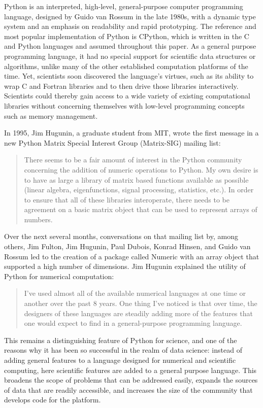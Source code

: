 \documentclass[fleqn,10pt]{wlscirep}
\begin{document}
Python is an interpreted, high-level, general-purpose computer programming
language, designed by Guido van Rossum in the late 1980s,
with a dynamic type system and an emphasis on readability and rapid prototyping.
The reference and most popular implementation of Python is 
CPython\cite{cpython-refman,cpython-source}, which is written
in the C and Python languages and assumed throughout this paper.
%
As a general purpose programming language, it had no special support for 
scientific data structures or algorithms, unlike many of the other established
computation platforms of the time. Yet, scientists soon discovered the
language's virtues, such as its ability to wrap C and Fortran
libraries and to then drive those libraries interactively.  Scientists
could thereby gain access to a wide variety of existing computational
libraries without concerning themselves with low-level programming
concepts such as memory management.

In 1995, Jim Hugunin, a graduate student from MIT, wrote the first
message in a new Python Matrix Special Interest Group (Matrix-SIG)
mailing list\cite{Hugunin-first}:
\begin{quote}
There seems to be a fair amount of interest in the Python community
concerning the addition of numeric operations to Python.  My own desire is
to have as large a library of matrix based functions available as possible
(linear algebra, eigenfunctions, signal processing, statistics, etc.).  In
order to ensure that all of these libraries interoperate, there needs to
be agreement on a basic matrix object that can be used to represent arrays
of numbers.
\end{quote}
Over the next several months, conversations on that mailing
list by, among others, Jim Fulton, Jim Hugunin, Paul Dubois, Konrad
Hinsen, and Guido van Rossum led to the creation of a package called Numeric with an array object
that supported a high number of dimensions.  Jim Hugunin explained the utility
of Python for numerical computation\cite{Hugunin-whitepaper}:
\begin{quote}
I've used almost all of the available numerical languages at one time
or another over the past 8 years. One thing I've noticed is that over
time, the designers of these languages are steadily adding more of the
features that one would expect to find in a general-purpose
programming language.
\end{quote}
This remains a distinguishing feature of Python for science, and one of the
reasons why it has been so successful in the realm of data science: instead of
adding general features to a language designed for numerical and scientific
computing, here scientific features are added to a general purpose language.  
This broadens the scope of problems that can be addressed easily, expands the
sources of data that are readily accessible, and increases the size of the
community that develops code for the platform.
\end{document}
